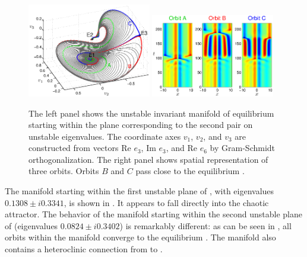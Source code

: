 \begin{figure}[t]
\begin{center} 
\includegraphics[width=0.48\textwidth]{figs/ks22_E1_plane2_manifold.eps}
\includegraphics[width=0.48\textwidth]{figs/ks22_E1_plane2_orbits.eps}
\end{center}
\caption{
The left panel shows the unstable
invariant manifold of equilibrium  starting within the plane
corresponding to the second pair on unstable eigenvalues. The
coordinate axes $v_1$, $v_2$, and $v_3$ are constructed from vectors
Re $e_3$, Im $e_3$, and Re $e_6$ by Gram-Schmidt orthogonalization.
The right panel shows spatial representation of three orbits. Orbits
$B$ and $C$ pass close to the equilibrium .
   }
\label{f:KS22E1man2}
\end{figure}

The manifold starting within the first unstable plane of , with
eigenvalues $0.1308\pm i0.3341$, is shown in
. It appears to fall directly into the
chaotic attractor.  The behavior of the manifold starting within
the second unstable plane of  (eigenvalues $0.0824\pm i0.3402$) is
remarkably different: as can be seen in ,
all orbits within the manifold converge to the equilibrium .  The
manifold also contains a heteroclinic connection from  to .

